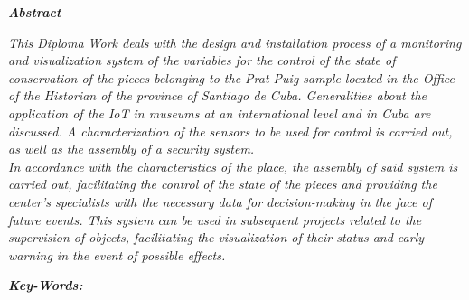 \setcounter{page}{5}
\thispagestyle{plain}

    \textbf{\textit{\Large Abstract}}
    \newline

    \textit{This Diploma Work deals with the design and installation process of a monitoring and visualization system of the variables for the control of the state of conservation of the pieces belonging to the Prat Puig sample located in the Office of the Historian of the province of Santiago de Cuba. Generalities about the application of the IoT in museums at an international level and in Cuba are discussed. A characterization of the sensors to be used for control is carried out, as well as the assembly of a security system.\\
    In accordance with the characteristics of the place, the assembly of said system is carried out, facilitating the control of the state of the pieces and providing the center's specialists with the necessary data for decision-making in the face of future events. This system can be used in subsequent projects related to the supervision of objects, facilitating the visualization of their status and early warning in the event of possible effects.}


    \textbf{\textit{Key-Words:} }